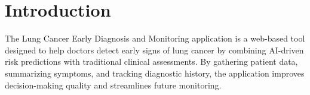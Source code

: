 \section{Introduction}
The Lung Cancer Early Diagnosis and Monitoring application is a web-based tool designed to help doctors detect early signs of lung cancer by combining AI-driven risk predictions with traditional clinical assessments. By gathering patient data, summarizing symptoms, and tracking diagnostic history, the application improves decision-making quality and streamlines future monitoring.
